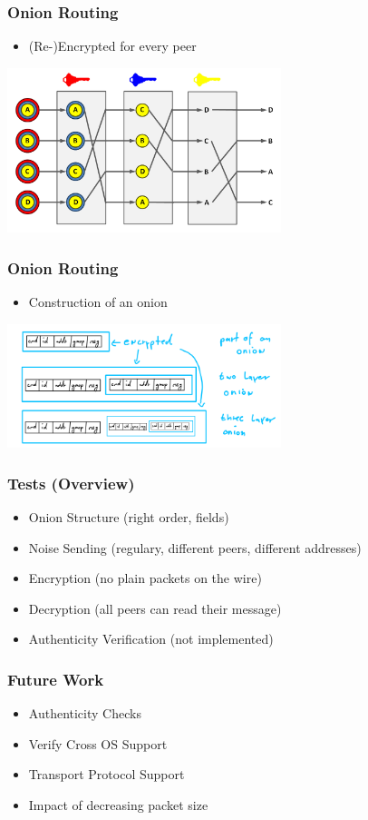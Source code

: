 \documentclass{beamer}
\begin{document}
\frame
{
  \frametitle{Onion Routing}
  \begin{itemize}
      \item (Re-)Encrypted for every peer
   \end{itemize}
  \begin{center}
   \includegraphics[width=8cm]{../Decryption_mix_net.png}
  \end{center}
}

\frame
{
  \frametitle{Onion Routing}
  \begin{itemize}
      \item Construction of an onion
   \end{itemize}
  \begin{center}
   \includegraphics[width=8cm]{../onion.png}
  \end{center}
}


\frame
{
  \frametitle{Tests (Overview)}
  \begin{itemize}
          \item Onion Structure (right order, fields)
          \item Noise Sending (regulary, different peers, different addresses)
          \item Encryption (no plain packets on the wire)
          \item Decryption (all peers can read their message)
          \item Authenticity Verification (\alert{not implemented})
   \end{itemize}
}

\frame
{
  \frametitle{Future Work}
  \begin{itemize}
    \item Authenticity Checks
    \item Verify Cross OS Support
    \item Transport Protocol Support
    \item Impact of decreasing packet size
  \end{itemize}
}
\end{document}
